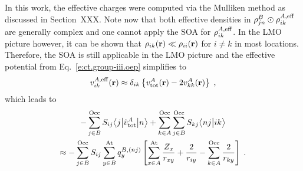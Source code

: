 %
In this work, the effective charges were computed via the Mulliken method as
discussed in Section~XXX. 
Note now that both effective densities in 
$\rho^B_{jn} \odot \rho^{A,{\rm eff}}_{ik}$ are generally complex and one cannot apply the SOA
for $\rho^{A,{\rm eff}}_{ik}$. In the LMO picture however, it can be shown that
$\rho_{ik} ({\bf r}) \ll \rho_{ii} ({\bf r})$ 
for $i\ne k$ in most locations. Therefore,
the SOA is still applicable in the LMO picture
and the effective potential from Eq.~\eqref{e:ct.group-iii.oep} 
simplifies to
%
\begin{equation} \label{e:ct.group-iii.oep.simplified}
 {v}^{A,{\rm eff}}_{ik}({\bf r}) \approx
 \delta_{ik} \left\{
 {v}^A_{\rm tot} ({\bf r})- 2{v}^A_{kk} ({\bf r}) \right\} \;,
\end{equation}
%
which
leads to 
%
\begin{multline} \label{e:ct.group-iii.final.b}
        - \sum_{j\in B}^{\rm Occ} S_{ij} \bigl\langle {j} \bigl\lvert {\hat{v}^A_{\rm tot} } \bigl\lvert {n} \bigr\rangle  
     + \sum_{k\in A}^{\rm Occ} \sum_{j\in B}^{\rm Occ}  
        S_{kj}
        \bigl\langle {nj} \bigl\lvert {ik} \bigr\rangle  \\
 \approx  -
 \sum_{j\in B}^{\rm Occ} S_{ij}
 \sum_{y\in B}^{\rm At} 
 q^{B,(nj)}_{y} 
 \left[ 
   \sum_{x\in A}^{\rm At}
   \frac{Z_x}{r_{xy}}
  + \frac{2}{r_{iy}}
  - \sum_{k\in A}^{\rm Occ}
    \frac{2}{r_{ky}} 
 \right]
 \;.
\end{multline}
%


